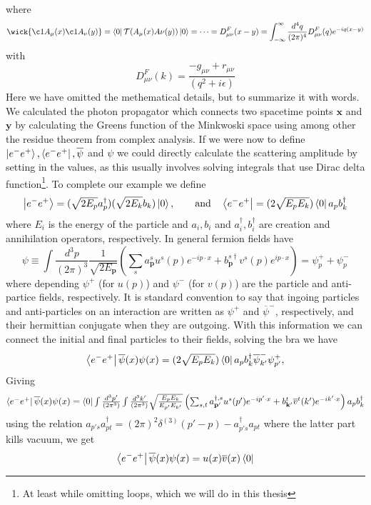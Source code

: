 \documentclass[12pt, a4paper]{book}
\begin{document}
where 
$$
\wick{\c1A_\mu(x)\c1A_\nu(y)} = \bra{0}\mathcal{T}(A_\mu(x)A\nu(y))\ket{0} = \cdots = D_{\mu\nu}^F(x-y) = \int_{-\infty}^{\infty}\frac{d^4q}{(2\pi)^4}D_{\mu\nu}^F(q)e^{-iq(x-y)}
$$
with
\begin{equation}\label{eq:p-prop}
    D_{\mu\nu}^F(k) = \frac{-g_{\mu\nu}+r_{\mu\nu}}{(q^2+i\epsilon)}
\end{equation}
Here we have omitted the methematical details, but to summarize it with words. We calculated the photon propagator which connects two spacetime points $\mathbf{x}$ and $\mathbf{y}$ by calculating the Greens function of the Minkwoski space using among other the residue theorem from complex analysis. 
If we were now to define $\ket{e^-e^+}, \bra{e^-e^+}, \overline{\psi}$ and $\psi$ we could directly calculate the scattering amplitude by setting in the values, as this usually involves solving integrals that use Dirac delta function\footnote{At least while omitting loops, which we will do in this thesis}. 
To complete our example we define
$$
\ket{e^-e^+} = (\sqrt{2E_p}a^\dagger_{p})(\sqrt{2E_k}b_{k})\ket{0},\qquad\text{and}\quad \bra{e^-e^+} = (2\sqrt{E_pE_k})\bra{0}a_{p}b^\dagger_{k}
$$
where $E_i$ is the energy of the particle and $a_i,b_i$ and $a^\dagger_i,b^\dagger_i$ are creation and annihilation operators, respectively. In general fermion fields have
$$
\psi \equiv\int\frac{d^3p}{(2\pi)^3}\frac{1}{\sqrt{2E_\mathbf{p}}}\left(\sum_sa^s_\mathbf{p}u^s(p)e^{-ip\cdot x}+b^{s\dagger}_\mathbf{p}v^s(p)e^{ip\cdot x}\right) =\psi^+_p+\psi^-_p
$$
where depending $\psi^+$ (for $u(p)$) and $\psi^-$ (for $v(p)$) are the particle and anti-partice fields, respectively. It is standard convention to say that ingoing particles and anti-particles 
on an interaction are written as $\psi^+$ and $\overline{\psi}^-$, respectively, and their hermittian conjugate when they are outgoing. With this information we can connect the initial and final particles to their fields, solving the bra we have
$$
\bra{e^-e^+}\overline{\psi}(x)\psi(x) = (2\sqrt{E_pE_k})\bra{0}a_{p}b^\dagger_{k}\overline{\psi}^-_{k'}\psi^+_{p'},
$$
Giving
$$
\textstyle\bra{e^-e^+}\overline{\psi}(x)\psi(x) = \bra{0} \int\frac{d^3p'}{(2\pi^3)}\int\frac{d^3k'}{(2\pi^3)}\sqrt{\frac{E_pE_k}{E_{p'}E_{k'}}} \left(\sum_{s,t}a^{\dagger,s}_\mathbf{p'}u^s(p')e^{-ip'\cdot x} + b^{t}_\mathbf{k'}\overline{v}^t(k')e^{-ik'\cdot x}\right)a_{p}b^\dagger_{k}
$$
using the relation $a_{p's}a_{pt}^\dagger = (2\pi)^2\delta^{(3)}(p'-p)- a_{p's}^\dagger a_{pt}$ where the latter part kills vacuum, we get
$$
\bra{e^-e^+}\overline{\psi}(x)\psi(x) = u(x)\overline{v}(x)\bra{0}
$$
\end{document}
